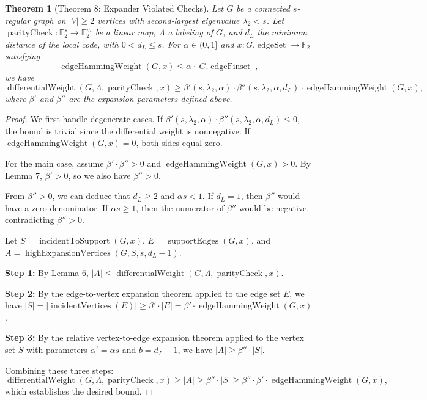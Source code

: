 \documentclass[11pt]{article}
\theoremstyle{plain}
\newtheorem*{theorem}{Theorem}
\theoremstyle{definition}
\theoremstyle{remark}
\begin{document}
\begin{theorem}[Theorem 8: Expander Violated Checks]
Let $G$ be a connected $s$-regular graph on $|V| \geq 2$ vertices with second-largest eigenvalue $\lambda_2 < s$. Let $\operatorname{parityCheck} : \mathbb{F}_2^s \to \mathbb{F}_2^m$ be a linear map, $\Lambda$ a labeling of $G$, and $d_L$ the minimum distance of the local code, with $0 < d_L \leq s$. For $\alpha \in (0, 1]$ and $x : G.\operatorname{edgeSet} \to \mathbb{F}_2$ satisfying
\[
\operatorname{edgeHammingWeight}(G, x) \leq \alpha \cdot |G.\operatorname{edgeFinset}|,
\]
we have
\[
\operatorname{differentialWeight}(G, \Lambda, \operatorname{parityCheck}, x) \geq \beta'(s, \lambda_2, \alpha) \cdot \beta''(s, \lambda_2, \alpha, d_L) \cdot \operatorname{edgeHammingWeight}(G, x),
\]
where $\beta'$ and $\beta''$ are the expansion parameters defined above.
\end{theorem}

\begin{proof}
We first handle degenerate cases. If $\beta'(s, \lambda_2, \alpha) \cdot \beta''(s, \lambda_2, \alpha, d_L) \leq 0$, the bound is trivial since the differential weight is nonnegative. If $\operatorname{edgeHammingWeight}(G, x) = 0$, both sides equal zero.

For the main case, assume $\beta' \cdot \beta'' > 0$ and $\operatorname{edgeHammingWeight}(G, x) > 0$. By Lemma 7, $\beta' > 0$, so we also have $\beta'' > 0$.

From $\beta'' > 0$, we can deduce that $d_L \geq 2$ and $\alpha s < 1$. If $d_L = 1$, then $\beta''$ would have a zero denominator. If $\alpha s \geq 1$, then the numerator of $\beta''$ would be negative, contradicting $\beta'' > 0$.

Let $S = \operatorname{incidentToSupport}(G, x)$, $E = \operatorname{supportEdges}(G, x)$, and $A = \operatorname{highExpansionVertices}(G, S, s, d_L - 1)$.

\textbf{Step 1:} By Lemma 6, $|A| \leq \operatorname{differentialWeight}(G, \Lambda, \operatorname{parityCheck}, x)$.

\textbf{Step 2:} By the edge-to-vertex expansion theorem applied to the edge set $E$, we have $|S| = |\operatorname{incidentVertices}(E)| \geq \beta' \cdot |E| = \beta' \cdot \operatorname{edgeHammingWeight}(G, x)$.

\textbf{Step 3:} By the relative vertex-to-edge expansion theorem applied to the vertex set $S$ with parameters $\alpha' = \alpha s$ and $b = d_L - 1$, we have $|A| \geq \beta'' \cdot |S|$.

Combining these three steps:
\[
\operatorname{differentialWeight}(G, \Lambda, \operatorname{parityCheck}, x) \geq |A| \geq \beta'' \cdot |S| \geq \beta'' \cdot \beta' \cdot \operatorname{edgeHammingWeight}(G, x),
\]
which establishes the desired bound.
\end{proof}
\end{document}
